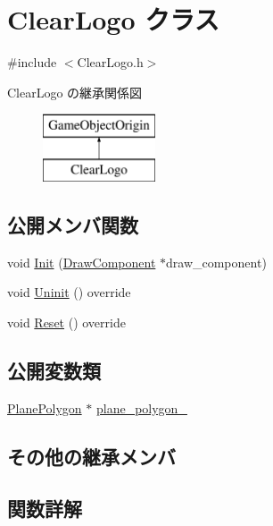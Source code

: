 \hypertarget{class_clear_logo}{}\section{Clear\+Logo クラス}
\label{class_clear_logo}


{\ttfamily \#include $<$Clear\+Logo.\+h$>$}

Clear\+Logo の継承関係図\begin{figure}[H]
\begin{center}
\leavevmode
\includegraphics[height=2.000000cm]{class_clear_logo}
\end{center}
\end{figure}
\subsection*{公開メンバ関数}
\begin{DoxyCompactItemize}
\item 
void \mbox{\hyperlink{class_clear_logo_a31b724ff4be2c03072cf5c2c68b4fcbb}{Init}} (\mbox{\hyperlink{class_draw_component}{Draw\+Component}} $\ast$draw\+\_\+component)
\item 
void \mbox{\hyperlink{class_clear_logo_ab55def116615b92a8e8cc40b364b7a4c}{Uninit}} () override
\item 
void \mbox{\hyperlink{class_clear_logo_aa19369cbace0cc79957ef7b4d4dbd0f5}{Reset}} () override
\end{DoxyCompactItemize}
\subsection*{公開変数類}
\begin{DoxyCompactItemize}
\item 
\mbox{\hyperlink{class_plane_polygon}{Plane\+Polygon}} $\ast$ \mbox{\hyperlink{class_clear_logo_ad4c1abbd7e501cc44357c9f65e12482f}{plane\+\_\+polygon\+\_\+}}
\end{DoxyCompactItemize}
\subsection*{その他の継承メンバ}


\subsection{関数詳解}
\mbox{\label{class_clear_logo_a31b724ff4be2c03072cf5c2c68b4fcbb}} 
